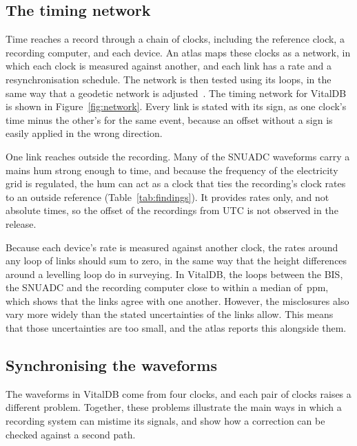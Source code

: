\documentclass[11pt,a4paper]{article}
\makeatletter
\newcommand{\fact}[1]{\@ifundefined{fact@#1}{\textcolor{red}{??#1}}{\@nameuse{fact@#1}}}
\makeatother
\begin{document}
\subsection{The timing network}
\label{sec:network}

Time reaches a record through a chain of clocks, including the reference clock, a recording computer, and each
device. An atlas maps these clocks as a network, in which each clock is measured against another, and each link has a
rate and a resynchronisation schedule. The network is then tested using its loops, in the same way that a geodetic
network is adjusted~\citep{ghilani2017adjustment}. The timing network for VitalDB is shown in
Figure~\ref{fig:network}. Every link is stated with its sign, as one clock's time minus the other's for the same event,
because an offset without a sign is easily applied in the wrong direction.

One link reaches outside the recording. Many of the SNUADC waveforms carry a mains hum strong enough to time, and because the frequency of the electricity grid is regulated, the hum can act as a clock that ties the
recording's clock rates to an outside reference (Table~\ref{tab:findings}). It provides rates only, and not absolute
times, so the offset of the recordings from UTC is not observed in the release.

Because each device's rate is measured against another clock, the rates around any loop of links should sum to zero,
in the same way that the height differences around a levelling loop do in surveying. In VitalDB, the loops between the BIS, the SNUADC and the recording
computer close to within a median of \fact{loop.bis}\,ppm, which shows that the links agree with one another. However,
the misclosures also vary more widely than the stated uncertainties of the links allow. This means that those
uncertainties are too small, and the atlas reports this alongside them.

\subsection{Synchronising the waveforms}
\label{sec:sync}

The waveforms in VitalDB come from four clocks, and each pair of clocks raises a different problem. Together, these
problems illustrate the main ways in which a recording system can mistime its signals, and show how a correction can be
checked against a second path.
\end{document}
